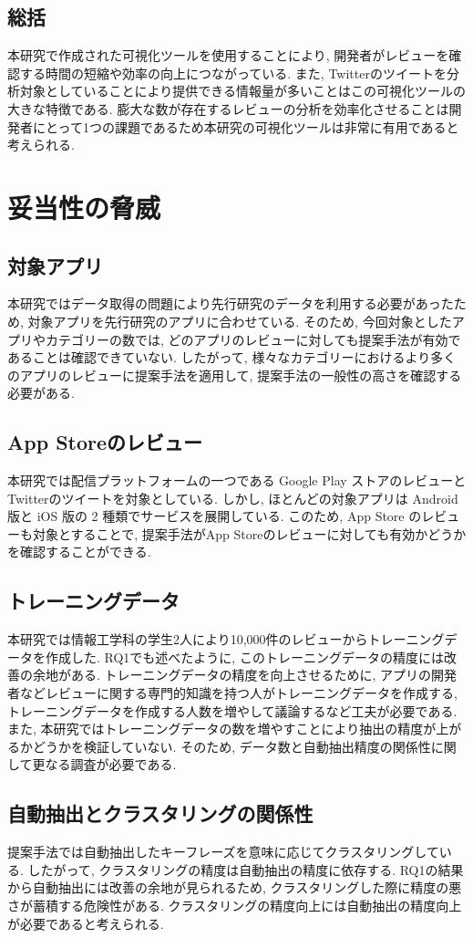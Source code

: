\subsection{総括}
本研究で作成された可視化ツールを使用することにより, 開発者がレビューを確認する時間の短縮や効率の向上につながっている. また, Twitterのツイートを分析対象としていることにより提供できる情報量が多いことはこの可視化ツールの大きな特徴である. 
膨大な数が存在するレビューの分析を効率化させることは開発者にとって1つの課題であるため本研究の可視化ツールは非常に有用であると考えられる. 

\section{妥当性の脅威}
\subsection{対象アプリ}
本研究ではデータ取得の問題により先行研究のデータを利用する必要があったため, 対象アプリを先行研究のアプリに合わせている. そのため, 今回対象としたアプリやカテゴリーの数では, どのアプリのレビューに対しても提案手法が有効であることは確認できていない. 
したがって, 様々なカテゴリーにおけるより多くのアプリのレビューに提案手法を適用して, 提案手法の一般性の高さを確認する必要がある. 

\subsection{App Storeのレビュー}
本研究では配信プラットフォームの一つである Google Play ストアのレビューとTwitterのツイートを対象としている. しかし, ほとんどの対象アプリは Android 版と iOS 版の 2 種類でサービスを展開している. 
このため, App Store のレビューも対象とすることで, 提案手法がApp Storeのレビューに対しても有効かどうかを確認することができる.

\subsection{トレーニングデータ}
本研究では情報工学科の学生2人により10,000件のレビューからトレーニングデータを作成した. RQ1でも述べたように, このトレーニングデータの精度には改善の余地がある. 
トレーニングデータの精度を向上させるために, アプリの開発者などレビューに関する専門的知識を持つ人がトレーニングデータを作成する, トレーニングデータを作成する人数を増やして議論するなど工夫が必要である. 
また, 本研究ではトレーニングデータの数を増やすことにより抽出の精度が上がるかどうかを検証していない. そのため, データ数と自動抽出精度の関係性に関して更なる調査が必要である. 

\subsection{自動抽出とクラスタリングの関係性}
提案手法では自動抽出したキーフレーズを意味に応じてクラスタリングしている. したがって, クラスタリングの精度は自動抽出の精度に依存する. 
RQ1の結果から自動抽出には改善の余地が見られるため, クラスタリングした際に精度の悪さが蓄積する危険性がある. クラスタリングの精度向上には自動抽出の精度向上が必要であると考えられる. 
